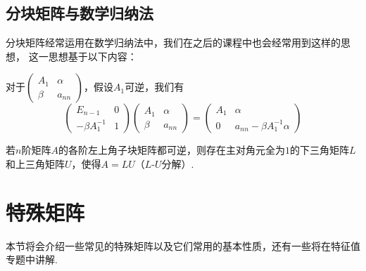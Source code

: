 \subsection{分块矩阵与数学归纳法}
分块矩阵经常运用在数学归纳法中，我们在之后的课程中也会经常用到这样的思想，
这一思想基于以下内容：

对于$\begin{pmatrix}
	A_1 & \alpha \\ \beta & a_{nn}
\end{pmatrix}$，假设$A_1$可逆，我们有
$$\begin{pmatrix}
	E_{n-1} & 0 \\ -\beta A_1^{-1} & 1
\end{pmatrix}\begin{pmatrix}
	A_1 & \alpha \\ \beta & a_{nn}
\end{pmatrix}=\begin{pmatrix}
	A_1 & \alpha \\ 0 & a_{nn}-\beta A_1^{-1}\alpha
\end{pmatrix}$$

\begin{example}
	若$n$阶矩阵$A$的各阶左上角子块矩阵都可逆，则存在主对角元全为$1$的下三角矩阵$L$和上三角矩阵$U$，使得$A=LU$（$L$-$U$分解）.
\end{example}

\section{特殊矩阵}
本节将会介绍一些常见的特殊矩阵以及它们常用的基本性质，还有一些将在特征值专题中讲解.
